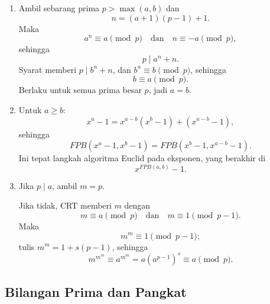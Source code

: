 \documentclass[12pt]{scrartcl}
\begin{document}
\begin{enumerate}[resume]
	Jika tidak, Euler mereduksi soal menjadi
	\begin{align*}
	6 \mid T_3 - T_2 &\quad (\text{mod } 9), \\
	12 \mid T_3 - T_2 &\quad (\text{mod } 13), \\
	16 \mid T_3 - T_2 &\quad (\text{mod } 17).
	\end{align*}
	Selalu
	\[ T_3 - T_2 = n^n(n^{T_2-n} - 1) \quad \text{dengan} \quad T_2 - n \ \text{genap}. \]
	Faktor $2$ dipenuhi lewat paritas ($n^n$ atau $n^{T_2-n} - 1$ genap);
	faktor $3$ dipenuhi $n^n$ saat $3 \mid n$ dan
	\[ n^{T_2-n} \equiv 1 \pmod{3} \quad \text{saat} \quad 3 \nmid n. \]
	Untuk faktor $16$ (mod $17$): jika $n$ genap ($n \ge 4$) maka $16 \mid n^n$;
	jika $n$ ganjil maka $v_2(T_2 - n) \ge 3$ dan LTE memberi
	\[ v_2(n^{T_2-n} - 1) \ge 3 + 3 - 1 = 5 \ge 4. \]
	Untuk faktor $4$ (mod $13$): jika $n$ genap maka $4 \mid n^n$;
	jika $n$ ganjil maka
	\[ n^{T_2-n} \equiv 1 \pmod{8}. \]

	\item Ambil sebarang prima $p > \max(a, b)$ dan
	\[ n = (a+1)(p-1) + 1. \]
	Maka
	\[ a^n \equiv a \pmod{p} \quad \text{dan} \quad n \equiv -a \pmod{p}, \]
	sehingga
	\[ p \mid a^n + n. \]
	Syarat memberi $p \mid b^n + n$, dan $b^n \equiv b \pmod{p}$,
	sehingga
	\[ b \equiv a \pmod{p}. \]
	Berlaku untuk semua prima besar $p$, jadi $a = b$.

	\item Untuk $a \ge b$:
	\[ x^a - 1 = x^{a-b}(x^b - 1) + (x^{a-b} - 1), \]
	sehingga
	\[ FPB(x^a - 1, x^b - 1) = FPB(x^b - 1, x^{a-b} - 1). \]
	Ini tepat langkah algoritma Euclid pada eksponen,
	yang berakhir di
	\[ x^{FPB(a,b)} - 1. \]

	\item Jika $p \mid a$, ambil $m = p$.

	Jika tidak, CRT memberi $m$ dengan
	\[ m \equiv a \pmod{p} \quad \text{dan} \quad m \equiv 1 \pmod{p-1}. \]
	Maka
	\[ m^m \equiv 1 \pmod{p-1}; \]
	tulis $m^m = 1 + s(p-1)$, sehingga
	\[ m^{m^m} \equiv a^{m^m} = a(a^{p-1})^s \equiv a \pmod{p}. \]
\end{enumerate}

\subsection{Bilangan Prima dan Pangkat}
\end{document}
